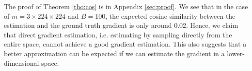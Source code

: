 The proof of Theorem \ref{tho:cos} is in Appendix \ref{sec:proof}. We see that in the case of $m=3\times224\times224$ and $B=100$, the expected cosine similarity between the estimation and the ground truth gradient is only around 0.02.
Hence, we claim that direct gradient estimation, i.e. estimating by sampling directly from the entire space, cannot achieve a good gradient estimation.
This also suggests that a better approximation can be expected if we can estimate the gradient in a lower-dimensional space. 
